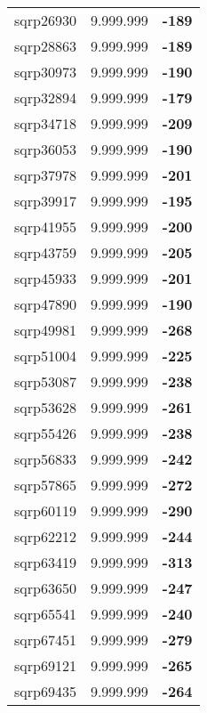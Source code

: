 \begin{tabular}{cc||c}
sqrp26930        & 9.999.999        & {\bf -189}      \\ 
sqrp28863        & 9.999.999        & {\bf -189}      \\ 
sqrp30973        & 9.999.999        & {\bf -190}      \\ 
sqrp32894        & 9.999.999        & {\bf -179}      \\ 
sqrp34718        & 9.999.999        & {\bf -209}      \\ 
sqrp36053        & 9.999.999        & {\bf -190}      \\ 
sqrp37978        & 9.999.999        & {\bf -201}      \\ 
sqrp39917        & 9.999.999        & {\bf -195}      \\ 
sqrp41955        & 9.999.999        & {\bf -200}      \\ 
sqrp43759        & 9.999.999        & {\bf -205}      \\ 
sqrp45933        & 9.999.999        & {\bf -201}      \\ 
sqrp47890        & 9.999.999        & {\bf -190}      \\ 
sqrp49981        & 9.999.999        & {\bf -268}      \\ 
sqrp51004        & 9.999.999        & {\bf -225}      \\ 
sqrp53087        & 9.999.999        & {\bf -238}      \\ 
sqrp53628        & 9.999.999        & {\bf -261}      \\ 
sqrp55426        & 9.999.999        & {\bf -238}      \\ 
sqrp56833        & 9.999.999        & {\bf -242}      \\ 
sqrp57865        & 9.999.999        & {\bf -272}      \\ 
sqrp60119        & 9.999.999        & {\bf -290}      \\ 
sqrp62212        & 9.999.999        & {\bf -244}      \\ 
sqrp63419        & 9.999.999        & {\bf -313}      \\ 
sqrp63650        & 9.999.999        & {\bf -247}      \\ 
sqrp65541        & 9.999.999        & {\bf -240}      \\ 
sqrp67451        & 9.999.999        & {\bf -279}      \\ 
sqrp69121        & 9.999.999        & {\bf -265}      \\ 
sqrp69435        & 9.999.999        & {\bf -264}      \\ 

\end{tabular}
